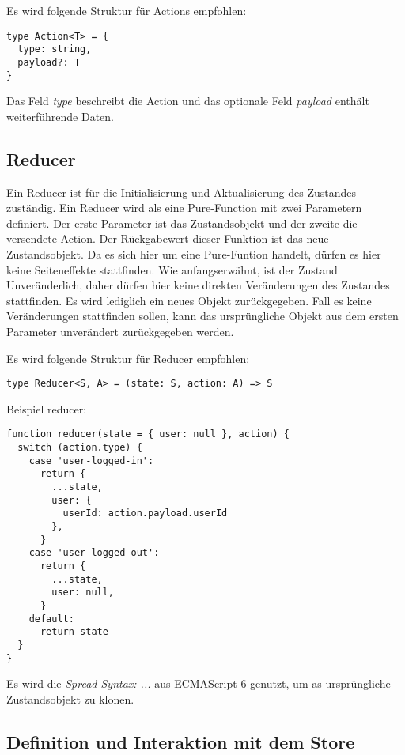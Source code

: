 Es wird folgende Struktur für Actions empfohlen:
\begin{lstlisting}
type Action<T> = {
  type: string,
  payload?: T
}
\end{lstlisting}

Das Feld \textit{type} beschreibt die Action und das optionale Feld \textit{payload} enthält weiterführende Daten.

\subsection{Reducer}

Ein Reducer ist für die Initialisierung und Aktualisierung des Zustandes zuständig. Ein Reducer wird als eine Pure-Function mit zwei Parametern definiert.
Der erste Parameter ist das Zustandsobjekt und der zweite die versendete Action. Der Rückgabewert dieser Funktion ist das neue Zustandsobjekt. Da es sich hier um eine Pure-Funtion handelt, dürfen es hier keine Seiteneffekte stattfinden. Wie anfangserwähnt, ist der Zustand Unveränderlich, daher dürfen hier keine direkten Veränderungen des Zustandes stattfinden. Es wird lediglich ein neues Objekt zurückgegeben. Fall es keine Veränderungen stattfinden sollen, kann das ursprüngliche Objekt aus dem ersten Parameter unverändert zurückgegeben werden.\cite{reduxStateActionReducers}

Es wird folgende Struktur für Reducer empfohlen:
\begin{lstlisting}
type Reducer<S, A> = (state: S, action: A) => S
\end{lstlisting}

Beispiel reducer:

\begin{lstlisting}
function reducer(state = { user: null }, action) {
  switch (action.type) {
    case 'user-logged-in':
      return {
        ...state,
        user: {
          userId: action.payload.userId
        },
      }
    case 'user-logged-out':
      return {
        ...state,
        user: null,
      }
    default:
      return state
  }
}
\end{lstlisting}

Es wird die \textit{Spread Syntax: ...} aus ECMAScript 6 genutzt, um as ursprüngliche Zustandsobjekt zu klonen.\cite{mdnSpreadSyntax}

\subsection{Definition und Interaktion mit dem Store}

